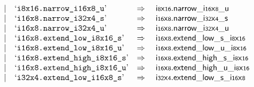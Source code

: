 $$\begin{array}[t]{@{}lrrl@{}l@{}l@{}l@{}}
& & | & \mbox{‘\texttt{i8x16.narrow\_i16x8\_u}’} & \quad\Rightarrow\quad{} & {{\mathsf{i{\scriptstyle 8}}}{\mathsf{x}}{\mathsf{{\scriptstyle 16}}}{.}\mathsf{narrow}}{\mathsf{\_}}{{\mathsf{i{\scriptstyle 16}}}{\mathsf{x}}{\mathsf{{\scriptstyle 8}}}}{\mathsf{\_}}{\mathsf{u}} \\
& & | & \mbox{‘\texttt{i16x8.narrow\_i32x4\_s}’} & \quad\Rightarrow\quad{} & {{\mathsf{i{\scriptstyle 16}}}{\mathsf{x}}{\mathsf{{\scriptstyle 8}}}{.}\mathsf{narrow}}{\mathsf{\_}}{{\mathsf{i{\scriptstyle 32}}}{\mathsf{x}}{\mathsf{{\scriptstyle 4}}}}{\mathsf{\_}}{\mathsf{s}} \\
& & | & \mbox{‘\texttt{i16x8.narrow\_i32x4\_u}’} & \quad\Rightarrow\quad{} & {{\mathsf{i{\scriptstyle 16}}}{\mathsf{x}}{\mathsf{{\scriptstyle 8}}}{.}\mathsf{narrow}}{\mathsf{\_}}{{\mathsf{i{\scriptstyle 32}}}{\mathsf{x}}{\mathsf{{\scriptstyle 4}}}}{\mathsf{\_}}{\mathsf{u}} \\
& & | & \mbox{‘\texttt{i16x8.extend\_low\_i8x16\_s}’} & \quad\Rightarrow\quad{} & {\mathsf{i{\scriptstyle 16}}}{\mathsf{x}}{\mathsf{{\scriptstyle 8}}} {.} {{\mathsf{extend}}{\mathsf{\_}}{\mathsf{low}}{\mathsf{\_}}{\mathsf{s}}}{\mathsf{\_}}{{\mathsf{i{\scriptstyle 8}}}{\mathsf{x}}{\mathsf{{\scriptstyle 16}}}} \\
& & | & \mbox{‘\texttt{i16x8.extend\_low\_i8x16\_u}’} & \quad\Rightarrow\quad{} & {\mathsf{i{\scriptstyle 16}}}{\mathsf{x}}{\mathsf{{\scriptstyle 8}}} {.} {{\mathsf{extend}}{\mathsf{\_}}{\mathsf{low}}{\mathsf{\_}}{\mathsf{u}}}{\mathsf{\_}}{{\mathsf{i{\scriptstyle 8}}}{\mathsf{x}}{\mathsf{{\scriptstyle 16}}}} \\
& & | & \mbox{‘\texttt{i16x8.extend\_high\_i8x16\_s}’} & \quad\Rightarrow\quad{} & {\mathsf{i{\scriptstyle 16}}}{\mathsf{x}}{\mathsf{{\scriptstyle 8}}} {.} {{\mathsf{extend}}{\mathsf{\_}}{\mathsf{high}}{\mathsf{\_}}{\mathsf{s}}}{\mathsf{\_}}{{\mathsf{i{\scriptstyle 8}}}{\mathsf{x}}{\mathsf{{\scriptstyle 16}}}} \\
& & | & \mbox{‘\texttt{i16x8.extend\_high\_i8x16\_u}’} & \quad\Rightarrow\quad{} & {\mathsf{i{\scriptstyle 16}}}{\mathsf{x}}{\mathsf{{\scriptstyle 8}}} {.} {{\mathsf{extend}}{\mathsf{\_}}{\mathsf{high}}{\mathsf{\_}}{\mathsf{u}}}{\mathsf{\_}}{{\mathsf{i{\scriptstyle 8}}}{\mathsf{x}}{\mathsf{{\scriptstyle 16}}}} \\
& & | & \mbox{‘\texttt{i32x4.extend\_low\_i16x8\_s}’} & \quad\Rightarrow\quad{} & {\mathsf{i{\scriptstyle 32}}}{\mathsf{x}}{\mathsf{{\scriptstyle 4}}} {.} {{\mathsf{extend}}{\mathsf{\_}}{\mathsf{low}}{\mathsf{\_}}{\mathsf{s}}}{\mathsf{\_}}{{\mathsf{i{\scriptstyle 16}}}{\mathsf{x}}{\mathsf{{\scriptstyle 8}}}} \\

\end{array}$$
